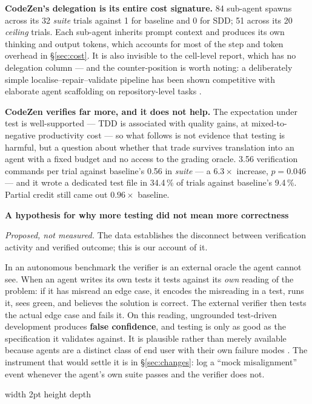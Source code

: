\documentclass[11pt,a4paper]{article}
\newenvironment{finding}[1]
  {\par\medskip\noindent\begin{lrbox}{\findingbox}%
   \begin{minipage}{\dimexpr\linewidth-2\fboxsep-4pt}%
   \vspace{3pt}\textbf{\color{accent}#1}\par\smallskip\small}
  {\vspace{4pt}\end{minipage}\end{lrbox}%
   \noindent\textcolor{accent}{\vrule width 2pt height \dimexpr\ht\findingbox\relax depth \dimexpr\dp\findingbox\relax}%
   \colorbox{shade}{\usebox{\findingbox}}\par\medskip}
\begin{document}
\begin{table}[htbp]
\centering
\caption{The five behavioural measures that carry a mechanism. Shell commands are bucketed by
pattern rather than parsed, so ``verification commands'' is a comparison between conditions on
one corpus, not an absolute count.}
\label{tab:behaviour}
\small

\end{table}

\textbf{CodeZen's delegation is its entire cost signature.} 84 sub-agent spawns across its 32
\emph{suite} trials against 1 for baseline and 0 for SDD; 51 across its 20 \emph{ceiling}
trials. Each sub-agent inherits prompt context and produces its own thinking and output
tokens, which accounts for most of the step and token overhead in \S\ref{sec:cost}. It is also
invisible to the cell-level report, which has no delegation column --- and the
counter-position is worth noting: a deliberately simple localise--repair--validate pipeline
has been shown competitive with elaborate agent scaffolding on repository-level tasks
\citep{xia2024agentless}.

\textbf{CodeZen verifies far more, and it does not help.} The expectation under test is
well-supported --- TDD is associated with quality gains, at mixed-to-negative productivity
cost \citep{bissi2016tdd,tosun2017industry} --- so what follows is not evidence that testing
is harmful, but a question about whether that trade survives translation into an agent with a
fixed budget and no access to the grading oracle. 3.56 verification commands per trial against
baseline's 0.56 in \emph{suite} --- a $6.3\times$ increase, $p = 0.046$ --- and it wrote a
dedicated test file in 34.4\,\% of trials against baseline's 9.4\,\%. Partial credit still came
out $0.96\times$ baseline.

\begin{finding}{A hypothesis for why more testing did not mean more correctness}
\emph{Proposed, not measured.} The data establishes the disconnect between verification
activity and verified outcome; this is our account of it.

In an autonomous benchmark the verifier is an external oracle the agent cannot see. When an
agent writes its own tests it tests against its \emph{own} reading of the problem: if it has
misread an edge case, it encodes the misreading in a test, runs it, sees green, and believes
the solution is correct. The external verifier then tests the actual edge case and fails it.
On this reading, ungrounded test-driven development produces \textbf{false confidence}, and
testing is only as good as the specification it validates against. It is plausible rather than
merely available because agents are a distinct class of end user with their own failure modes
\citep{yang2024sweagent}. The instrument that would settle it is in \S\ref{sec:changes}: log a
``mock misalignment'' event whenever the agent's own suite passes and the verifier does not.
\end{finding}
\end{document}
